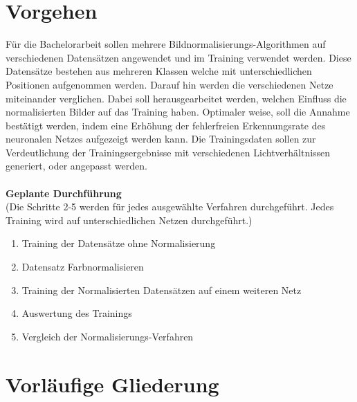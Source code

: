 \documentclass[a4paper,12pt,oneside]{article}
\begin{document}
  \section{Vorgehen}
Für die Bachelorarbeit sollen mehrere Bildnormalisierungs-Algorithmen auf verschiedenen Datensätzen angewendet und im Training verwendet werden. Diese Datensätze bestehen aus mehreren Klassen welche mit unterschiedlichen Positionen aufgenommen werden. Darauf hin werden die verschiedenen Netze miteinander verglichen. Dabei
soll herausgearbeitet werden, welchen Einfluss die normalisierten Bilder auf das Training
haben. Optimaler weise, soll die Annahme bestätigt werden, indem eine Erhöhung der fehlerfreien
Erkennungsrate des neuronalen Netzes aufgezeigt werden kann. Die Trainingsdaten sollen zur Verdeutlichung der Trainingsergebnisse mit verschiedenen Lichtverhältnissen generiert, oder angepasst werden.\\\\
\textbf{Geplante Durchführung}\\
(Die Schritte 2-5 werden für jedes ausgewählte Verfahren durchgeführt. Jedes Training wird auf unterschiedlichen Netzen durchgeführt.)
  \begin{enumerate}
\item Training der Datensätze ohne Normalisierung
\item Datensatz Farbnormalisieren
\item Training der Normalisierten Datensätzen auf einem weiteren Netz
\item Auswertung des Trainings
\item Vergleich der Normalisierungs-Verfahren
  \end{enumerate}
  
  \newpage
  
  \section{Vorläufige Gliederung}
  
\end{document}
